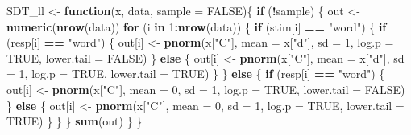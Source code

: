 \documentclass[]{book}
\newenvironment{Shaded}{\begin{snugshade}}{\end{snugshade}}
\newcommand{\ControlFlowTok}[1]{\textcolor[rgb]{0.13,0.29,0.53}{\textbf{#1}}}
\newcommand{\DataTypeTok}[1]{\textcolor[rgb]{0.13,0.29,0.53}{#1}}
\newcommand{\DecValTok}[1]{\textcolor[rgb]{0.00,0.00,0.81}{#1}}
\newcommand{\KeywordTok}[1]{\textcolor[rgb]{0.13,0.29,0.53}{\textbf{#1}}}
\newcommand{\NormalTok}[1]{#1}
\newcommand{\OperatorTok}[1]{\textcolor[rgb]{0.81,0.36,0.00}{\textbf{#1}}}
\newcommand{\OtherTok}[1]{\textcolor[rgb]{0.56,0.35,0.01}{#1}}
\newcommand{\StringTok}[1]{\textcolor[rgb]{0.31,0.60,0.02}{#1}}
\begin{document}
\begin{Shaded}
\begin{Highlighting}[numbers=left,,]
\NormalTok{SDT_ll <-}\StringTok{ }\ControlFlowTok{function}\NormalTok{(x, data, }\DataTypeTok{sample =} \OtherTok{FALSE}\NormalTok{)\{}
  \ControlFlowTok{if}\NormalTok{ (}\OperatorTok{!}\NormalTok{sample) \{}
\NormalTok{    out <-}\StringTok{ }\KeywordTok{numeric}\NormalTok{(}\KeywordTok{nrow}\NormalTok{(data))}
    \ControlFlowTok{for}\NormalTok{ (i }\ControlFlowTok{in} \DecValTok{1}\OperatorTok{:}\KeywordTok{nrow}\NormalTok{(data)) \{}
      \ControlFlowTok{if}\NormalTok{ (stim[i] }\OperatorTok{==}\StringTok{ "word"}\NormalTok{) \{}
      \ControlFlowTok{if}\NormalTok{ (resp[i] }\OperatorTok{==}\StringTok{ "word"}\NormalTok{) \{}
\NormalTok{        out[i] <-}\StringTok{ }\KeywordTok{pnorm}\NormalTok{(x[}\StringTok{"C"}\NormalTok{], }\DataTypeTok{mean =}\NormalTok{ x[}\StringTok{"d"}\NormalTok{], }\DataTypeTok{sd =} \DecValTok{1}\NormalTok{, }
                        \DataTypeTok{log.p =} \OtherTok{TRUE}\NormalTok{, }\DataTypeTok{lower.tail =} \OtherTok{FALSE}\NormalTok{)}
\NormalTok{      \} }\ControlFlowTok{else}\NormalTok{ \{}
\NormalTok{        out[i] <-}\StringTok{ }\KeywordTok{pnorm}\NormalTok{(x[}\StringTok{"C"}\NormalTok{], }\DataTypeTok{mean =}\NormalTok{ x[}\StringTok{"d"}\NormalTok{], }\DataTypeTok{sd =} \DecValTok{1}\NormalTok{, }
                        \DataTypeTok{log.p =} \OtherTok{TRUE}\NormalTok{, }\DataTypeTok{lower.tail =} \OtherTok{TRUE}\NormalTok{)}
\NormalTok{      \}}
\NormalTok{    \} }\ControlFlowTok{else}\NormalTok{ \{}
      \ControlFlowTok{if}\NormalTok{ (resp[i] }\OperatorTok{==}\StringTok{ "word"}\NormalTok{) \{}
\NormalTok{        out[i] <-}\StringTok{ }\KeywordTok{pnorm}\NormalTok{(x[}\StringTok{"C"}\NormalTok{], }\DataTypeTok{mean =} \DecValTok{0}\NormalTok{, }\DataTypeTok{sd =} \DecValTok{1}\NormalTok{, }
                        \DataTypeTok{log.p =} \OtherTok{TRUE}\NormalTok{, }\DataTypeTok{lower.tail =} \OtherTok{FALSE}\NormalTok{)}
\NormalTok{      \} }\ControlFlowTok{else}\NormalTok{ \{}
\NormalTok{        out[i] <-}\StringTok{ }\KeywordTok{pnorm}\NormalTok{(x[}\StringTok{"C"}\NormalTok{], }\DataTypeTok{mean =} \DecValTok{0}\NormalTok{, }\DataTypeTok{sd =} \DecValTok{1}\NormalTok{, }
                        \DataTypeTok{log.p =} \OtherTok{TRUE}\NormalTok{, }\DataTypeTok{lower.tail =} \OtherTok{TRUE}\NormalTok{)}
\NormalTok{        \}}
\NormalTok{      \}}
\NormalTok{  \}}
  \KeywordTok{sum}\NormalTok{(out)}
\NormalTok{  \}}
\NormalTok{\}}
\end{Highlighting}
\end{Shaded}
\end{document}
